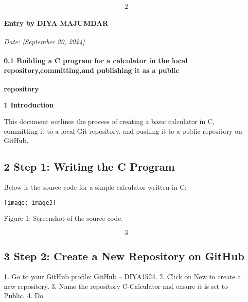 \documentclass{article} %
\begin{document}
\noindent 

\noindent 

\noindent 

\noindent 

\noindent 

\noindent 

\noindent 
\[2\] 

\paragraph{Entry by DIYA MAJUMDAR}

\noindent \textit{Date: [September 20, 2024]}

\noindent \textit{}

\noindent 
\paragraph{0.1  Building a C program for a calculator in the local repository,committing,and publishing it as a public}

\noindent \textbf{repository}

\noindent \textbf{1 Introduction}

\noindent This document outlines the process of creating a basic calculator in C, committing it to a local Git repository, and pushing it to a public repository on GitHub.

\noindent 

\noindent 
\subsection{2 Step 1: Writing the C Program}

\noindent Below is the source code for a simple calculator written in C:

\noindent \texttt{[image: image3]}

\noindent 

\noindent 

\noindent Figure 1: Screenshot of the source code.

\noindent 

\noindent 
\[3\] 

\subsection{3 Step 2: Create a New Repository on GitHub}

1. Go to your GitHub profile: GitHub -- DIYA1524. 2. Click on New to create a new repository. 3. Name the repository C-Calculator and ensure it is set to Public. 4. Do
\end{document}
